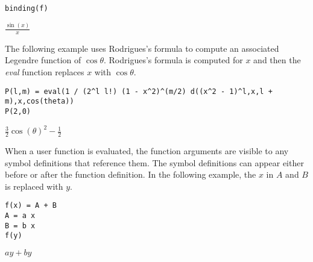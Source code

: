 \begin{Verbatim}[formatcom=\color{blue}]
binding(f)
\end{Verbatim}

\noindent
$\displaystyle \frac{\sin(x)}{x}$

\bigskip
\noindent
The following example uses Rodrigues's formula to
compute an associated Legendre function of $\cos\theta$.
Rodrigues's formula is computed for $x$ and then the
{\it eval} function replaces $x$ with $\cos\theta$.

\begin{Verbatim}[formatcom=\color{blue}]
P(l,m) = eval(1 / (2^l l!) (1 - x^2)^(m/2) d((x^2 - 1)^l,x,l + m),x,cos(theta))
P(2,0)
\end{Verbatim}

\noindent
$\displaystyle \tfrac{3}{2} \cos(\theta)^2-\tfrac{1}{2}$

\bigskip
\noindent
When a user function is evaluated, the function arguments are visible
to any symbol definitions that reference them.
The symbol definitions can appear either before or after the function definition.
In the following example, the $x$ in $A$ and $B$ is replaced with $y$.

\begin{Verbatim}[formatcom=\color{blue}]
f(x) = A + B
A = a x
B = b x
f(y)
\end{Verbatim}

\noindent
$\displaystyle ay+by$
